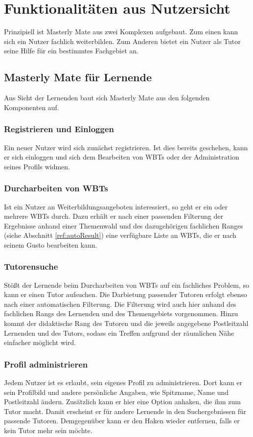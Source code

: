 \section{Funktionalitäten aus Nutzersicht}
Prinzipiell ist Masterly Mate aus zwei Komplexen aufgebaut. Zum einen kann sich
ein Nutzer fachlich weiterbilden. Zum Anderen bietet ein Nutzer als Tutor seine
Hilfe für ein bestimmtes Fachgebiet an.

\subsection{Masterly Mate für Lernende}
Aus Sicht der Lernenden baut sich Masterly Mate aus den folgenden Komponenten
auf.

\subsubsection{Registrieren und Einloggen}
Ein neuer Nutzer wird sich zunächst registrieren. Ist dies bereits geschehen,
kann er sich einloggen und sich dem Bearbeiten von WBTs oder der Administration
seines Profils widmen.

\subsubsection{Durcharbeiten von WBTs}
Ist ein Nutzer an Weiterbildungsangeboten interessiert, so geht er ein oder
mehrere WBTs durch. Dazu erhält er nach einer passenden Filterung der Ergebnisse
anhand einer Themenwahl und des dazugehörigen fachlichen Ranges (siehe Abschnitt
\ref{ref:autoResult}) eine verfügbare Liste an WBTs, die er nach seinem Gusto
bearbeiten kann.

\subsubsection{Tutorensuche}
Stößt der Lernende beim Durcharbeiten von WBTs auf ein fachliches Problem, so
kann er einen Tutor aufsuchen. Die Darbietung passender Tutoren erfolgt ebenso
nach einer automatischen Filterung. Die Filterung wird auch hier anhand des
fachlichen Rangs des Lernenden und des Themengebiets vorgenommen. Hinzu kommt
der didaktische Rang des Tutoren und die jeweils angegebene Postleitzahl
Lernenden und des Tutors, sodass ein Treffen aufgrund der räumlichen Nähe
einfacher möglicht wird.

\subsubsection{Profil administrieren}
Jedem Nutzer ist es erlaubt, sein eigenes Profil zu administrieren. Dort kann er
sein Profilbild und andere persönliche Angaben, wie Spitzname, Name und
Postleitzahl ändern. Zusätzlich kann er hier eine Option anhaken, die ihm zum
Tutor macht. Damit erscheint er für andere Lernende in den Suchergebnissen für
passende Tutoren. Demgegenüber kann er den Haken wieder entfernen, falls er kein
Tutor mehr sein möchte.

